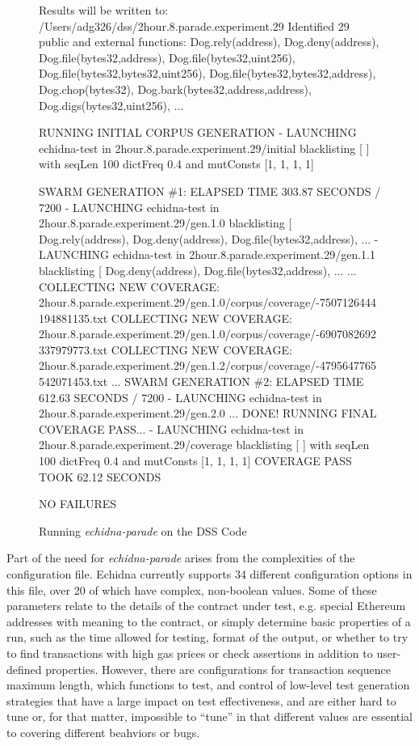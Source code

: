 \documentclass[sigconf,screen]{acmart}
\begin{document}
{\begin{figure*}
{\begin{code}
Results will be written to: /Users/adg326/dss/2hour.8.parade.experiment.29
Identified 29 public and external functions: Dog.rely(address), Dog.deny(address), Dog.file(bytes32,address), Dog.file(bytes32,uint256),
  Dog.file(bytes32,bytes32,uint256), Dog.file(bytes32,bytes32,address), Dog.chop(bytes32), Dog.bark(bytes32,address,address), Dog.digs(bytes32,uint256),
...

\vspace{0.1in}
  
RUNNING INITIAL CORPUS GENERATION
- LAUNCHING echidna-test in 2hour.8.parade.experiment.29/initial blacklisting [  ] with seqLen 100 dictFreq 0.4 and mutConsts  [1, 1, 1, 1]

\vspace{0.1in}

SWARM GENERATION \#1: ELAPSED TIME 303.87 SECONDS / 7200
- LAUNCHING echidna-test in 2hour.8.parade.experiment.29/gen.1.0
blacklisting [ Dog.rely(address), Dog.deny(address), Dog.file(bytes32,address), ...
- LAUNCHING echidna-test in 2hour.8.parade.experiment.29/gen.1.1 blacklisting [ Dog.deny(address), Dog.file(bytes32,address), ...
...
COLLECTING NEW COVERAGE: 2hour.8.parade.experiment.29/gen.1.0/corpus/coverage/-7507126444194881135.txt
COLLECTING NEW COVERAGE: 2hour.8.parade.experiment.29/gen.1.0/corpus/coverage/-6907082692337979773.txt
COLLECTING NEW COVERAGE: 2hour.8.parade.experiment.29/gen.1.2/corpus/coverage/-4795647765542071453.txt
...
SWARM GENERATION \#2: ELAPSED TIME 612.63 SECONDS / 7200
- LAUNCHING echidna-test in 2hour.8.parade.experiment.29/gen.2.0
...
DONE!
RUNNING FINAL COVERAGE PASS...
- LAUNCHING echidna-test in 2hour.8.parade.experiment.29/coverage blacklisting [  ] with seqLen 100 dictFreq 0.4 and mutConsts  [1, 1, 1, 1]
COVERAGE PASS TOOK 62.12 SECONDS

NO FAILURES
\end{code}
}
\caption{Running \emph{echidna-parade} on the DSS Code}
\label{fig:parade}
\end{figure*}

Part of the need for \emph{echidna-parade} arises from the
complexities of the configuration file.  Echidna currently supports 34
different configuration options in this file, over 20 of which have
complex, non-boolean values.  Some of these parameters relate to the
details of the contract under test, e.g. special Ethereum addresses
with meaning to the contract, or simply determine basic properties of
a run, such as the time allowed for testing, format of the output, or
whether to try to find transactions with high gas prices or check
assertions in addition to user-defined properties.  However, there are
configurations for transaction sequence maximum length, which
functions to test, and control of low-level test generation strategies
that have a large impact on test effectiveness, and are either hard to
tune or, for that matter, impossible to ``tune'' in that different
values are essential to covering different beahviors or bugs.

}
\end{document}
